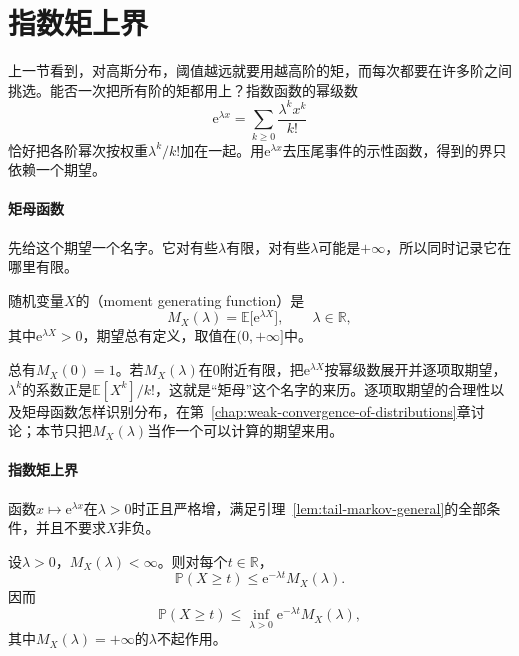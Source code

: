 \section{指数矩上界}
\label{sec:tail-exponential-moments}

上一节看到，对高斯分布，阈值越远就要用越高阶的矩，而每次都要在许多阶之间挑选。能否一次把所有阶的矩都用上？指数函数的幂级数
\[
 \mathrm{e}^{\lambda x}=\sum_{k\geq0}\frac{\lambda^kx^k}{k!}
\]
恰好把各阶幂次按权重$\lambda^k/k!$加在一起。用$\mathrm{e}^{\lambda x}$去压尾事件的示性函数，得到的界只依赖一个期望。

\paragraph{矩母函数}
先给这个期望一个名字。它对有些$\lambda$有限，对有些$\lambda$可能是$+\infty$，所以同时记录它在哪里有限。

\begin{definition}[矩母函数]
\label{def:tail-mgf}
随机变量$X$的（moment generating function）是
\begin{equation}
 M_X(\lambda)=\mathbb{E}\bigl[\mathrm{e}^{\lambda X}\bigr],\qquad \lambda\in\mathbb{R},
 \label{eq:tail-mgf}
\end{equation}
其中$\mathrm{e}^{\lambda X}>0$，期望总有定义，取值在$(0,+\infty]$中。
\end{definition}

总有$M_X(0)=1$。若$M_X(\lambda)$在$0$附近有限，把$\mathrm{e}^{\lambda X}$按幂级数展开并逐项取期望，$\lambda^k$的系数正是$\mathbb{E}[X^k]/k!$，这就是“矩母”这个名字的来历。逐项取期望的合理性以及矩母函数怎样识别分布，在第~\ref{chap:weak-convergence-of-distributions}章讨论；本节只把$M_X(\lambda)$当作一个可以计算的期望来用。

\paragraph{指数矩上界}
函数$x\mapsto\mathrm{e}^{\lambda x}$在$\lambda>0$时正且严格增，满足引理~\ref{lem:tail-markov-general}的全部条件，并且不要求$X$非负。

\begin{theorem}[指数矩上界]
\label{thm:tail-chernoff}
设$\lambda>0$，$M_X(\lambda)<\infty$。则对每个$t\in\mathbb{R}$，
\begin{equation}
 \mathbb{P}(X\geq t)\leq\mathrm{e}^{-\lambda t}M_X(\lambda) .
 \label{eq:tail-chernoff-lambda}
\end{equation}
因而
\begin{equation}
 \mathbb{P}(X\geq t)\leq\inf_{\lambda>0}\mathrm{e}^{-\lambda t}M_X(\lambda) ,
 \label{eq:tail-chernoff}
\end{equation}
其中$M_X(\lambda)=+\infty$的$\lambda$不起作用。
\end{theorem}

